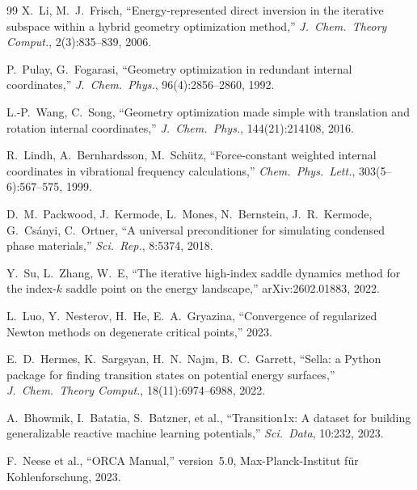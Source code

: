 \documentclass[11pt,a4paper]{article}
\theoremstyle{definition}
\begin{document}
\begin{thebibliography}{99}
  X.~Li, M.~J.~Frisch,
  ``Energy-represented direct inversion in the iterative subspace within a
  hybrid geometry optimization method,''
  \emph{J.\ Chem.\ Theory Comput.}, 2(3):835--839, 2006.

  P.~Pulay, G.~Fogarasi,
  ``Geometry optimization in redundant internal coordinates,''
  \emph{J.\ Chem.\ Phys.}, 96(4):2856--2860, 1992.

  L.-P.~Wang, C.~Song,
  ``Geometry optimization made simple with translation and rotation
  internal coordinates,''
  \emph{J.\ Chem.\ Phys.}, 144(21):214108, 2016.

  R.~Lindh, A.~Bernhardsson, M.~Sch\"utz,
  ``Force-constant weighted internal coordinates in vibrational frequency
  calculations,''
  \emph{Chem.\ Phys.\ Lett.}, 303(5--6):567--575, 1999.

  D.~M.~Packwood, J.~Kermode, L.~Mones, N.~Bernstein, J.~R.~Kermode,
  G.~Cs\'anyi, C.~Ortner,
  ``A universal preconditioner for simulating condensed phase materials,''
  \emph{Sci.\ Rep.}, 8:5374, 2018.

  Y.~Su, L.~Zhang, W.~E,
  ``The iterative high-index saddle dynamics method for the index-$k$
  saddle point on the energy landscape,''
  arXiv:2602.01883, 2022.

  L.~Luo, Y.~Nesterov, H.~He, E.~A.~Gryazina,
  ``Convergence of regularized Newton methods on degenerate critical points,''
  2023.

  E.~D.~Hermes, K.~Sargsyan, H.~N.~Najm, B.~C.~Garrett,
  ``Sella: a Python package for finding transition states on
  potential energy surfaces,''
  \emph{J.\ Chem.\ Theory Comput.}, 18(11):6974--6988, 2022.

  A.~Bhowmik, I.~Batatia, S.~Batzner, et al.,
  ``Transition1x: A dataset for building generalizable reactive machine
  learning potentials,''
  \emph{Sci.\ Data}, 10:232, 2023.

  F.~Neese et al., ``ORCA Manual,'' version~5.0, Max-Planck-Institut
  f\"ur Kohlenforschung, 2023.

\end{thebibliography}
\end{document}
